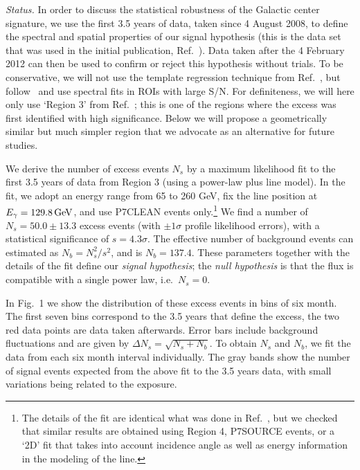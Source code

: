 \documentclass[aps,prd,superscriptaddress,nofootinbib,fixlfloat, 12pt]{revtex4-1}
\begin{document}
\emph{Status.} In order to discuss the statistical robustness of the Galactic
center
signature, we use the first 3.5 years of data, taken since 4 August 2008, to
define the spectral and spatial properties of our signal hypothesis (this is
the data set that was used in the initial publication,
Ref.~\cite{Bringmann:2012}). Data taken after the 4 February 2012 can then be
used to confirm or reject this hypothesis without trials. To be conservative,
we will not use the template regression technique from Ref.~\cite{linepaper},
but follow~\cite{Bringmann:2012, Weniger:2012} and use spectral fits in ROIs
with large S/N.  For definiteness, we will here only use `Region 3' from
Ref.~\cite{Weniger:2012}; this is one of the regions where the excess was
first identified with high significance. Below we will
propose a geometrically similar but much simpler region that we advocate as an
alternative for future studies.

We derive the number of excess events $N_s$ by a maximum likelihood fit to the
first 3.5 years of data from Region 3 (using a power-law plus line model). In
the fit, we adopt an energy range from 65 to 260 GeV, fix the line position at
$E_\gamma=129.8\rm\,GeV$, and use P7CLEAN events only.\footnote{The details of
the fit are identical what was done in Ref.~\cite{Weniger:2012}, but we
checked that similar results are obtained using Region 4, P7SOURCE events,
or a `2D' fit that takes into account incidence angle as well as energy
information in the modeling of the line.} We find a number of $N_s=50.0\pm 13.3$
excess events (with $\pm1\sigma$ profile likelihood errors), with a
statistical significance of $s=4.3\sigma$. The effective number
of background events can estimated as $N_b = N_s^2/s^2$, and is $N_b=137.4$.
These parameters together with the details of the fit define our \emph{signal
hypothesis}; the \emph{null hypothesis} is that the flux is compatible with a
single power law, i.e.~$N_s=0$.

In Fig.~1 we show the distribution of these excess events in bins of six
month. The first seven bins correspond to the 3.5 years that define the
excess, the two red data points are data taken afterwards. Error bars include
background fluctuations and are given by $\Delta N_s = \sqrt{N_s+N_b}$. To
obtain $N_s$ and $N_b$, we fit the data from each six month interval
individually. The gray bands show the number of signal events expected from
the above fit to the 3.5 years data, with small variations being related to
the exposure.
\end{document}
